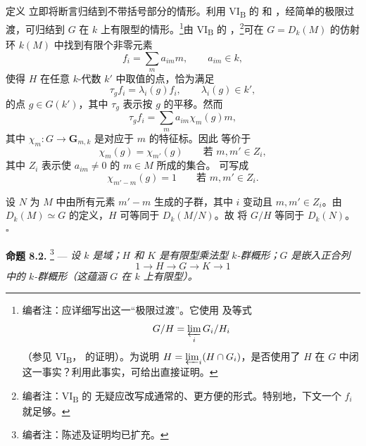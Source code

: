 定义  立即将断言归结到不带括号部分的情形。利用 VI\textsubscript{B} 的  和 ，经简单的极限过渡，可归结到 \(G\) 在 \(k\) 上有限型的情形。\footnote{编者注：应详细写出这一“极限过渡”。它使用  及等式
\[
  G/H=\varprojlim_i G_i/H_i
\]
（参见 VI\textsubscript{B}， 的证明）。为说明 \(H=\varprojlim_i(H\cap G_i)\)，是否使用了 \(H\) 在 \(G\) 中闭这一事实？利用此事实，可给出直接证明。}由 VI\textsubscript{B} 的 ，\footnote{编者注：VI\textsubscript{B} 的  无疑应改写成通常的、更方便的形式。特别地，下文一个 \(f_i\) 就足够。}可在 \(G=D_k(M)\) 的仿射环 \(k(M)\) 中找到有限个非零元素
\begin{equation}
  \tag{8.1.1}
  f_i=\sum_m a_{im}m,\qquad a_{im}\in k,
\end{equation}
使得 \(H\) 在任意 \(k\)-代数 \(k'\) 中取值的点，恰为满足
\begin{equation}
  \tag{8.1.2}
  \tau_g f_i=\lambda_i(g)f_i,
  \qquad \lambda_i(g)\in k',
\end{equation}
的点 \(g\in G(k')\)，其中 \(\tau_g\) 表示按 \(g\) 的平移。然而
\begin{equation}
  \tag{8.1.3}
  \tau_g f_i=\sum_m a_{im}\chi_m(g)m,
\end{equation}
其中 \(\chi_m:G\to\mathbf G_{m,k}\) 是对应于 \(m\) 的特征标。因此  等价于
\begin{equation}
  \tag{8.1.4}
  \chi_m(g)=\chi_{m'}(g)
  \qquad\text{若 }m,m'\in Z_i,
\end{equation}
其中 \(Z_i\) 表示使 \(a_{im}\neq0\) 的 \(m\in M\) 所成的集合。 可写成
\[
  \chi_{m'-m}(g)=1
  \qquad\text{若 }m,m'\in Z_i.
\]

设 \(N\) 为 \(M\) 中由所有元素 \(m'-m\) 生成的子群，其中 \(i\) 变动且 \(m,m'\in Z_i\)。由 \(D_k(M)\simeq G\) 的定义，\(H\) 可等同于 \(D_k(M/N)\)。故  将 \(G/H\) 等同于 \(D_k(N)\)。
\hfill\(\square\)

\medskip
\noindent{}\textbf{命题 8.2.}
\footnote{编者注：陈述及证明均已扩充。} ---
\textit{设 \(k\) 是域；\(H\) 和 \(K\) 是有限型乘法型 \(k\)-群概形；\(G\) 是嵌入正合列
\[
  1\longrightarrow H\longrightarrow G\longrightarrow K\longrightarrow 1
\]
中的 \(k\)-群概形（这蕴涵 \(G\) 在 \(k\) 上有限型）。}

